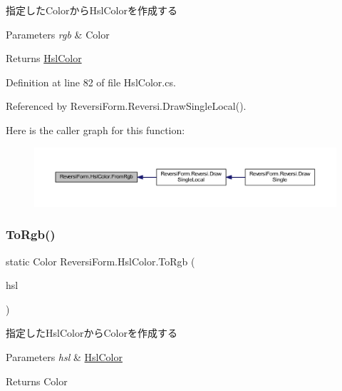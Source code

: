 指定した\+Colorから\+Hsl\+Colorを作成する 


\begin{DoxyParams}{Parameters}
{\em rgb} & Color\\
\hline
\end{DoxyParams}
\begin{DoxyReturn}{Returns}
\hyperlink{class_reversi_form_1_1_hsl_color}{Hsl\+Color}
\end{DoxyReturn}


Definition at line 82 of file Hsl\+Color.\+cs.



Referenced by Reversi\+Form.\+Reversi.\+Draw\+Single\+Local().

Here is the caller graph for this function\+:
\nopagebreak
\begin{figure}[H]
\begin{center}
\leavevmode
\includegraphics[width=350pt]{class_reversi_form_1_1_hsl_color_a1ef52b0701860ca2021e74e8ee369789_icgraph}
\end{center}
\end{figure}
\mbox{\label{class_reversi_form_1_1_hsl_color_aa7036039dd3abc7a1216be97656467df}} 
\subsubsection{\texorpdfstring{To\+Rgb()}{ToRgb()}}
{\footnotesize\ttfamily static Color Reversi\+Form.\+Hsl\+Color.\+To\+Rgb (\begin{DoxyParamCaption}\item[{\hyperlink{class_reversi_form_1_1_hsl_color}{Hsl\+Color}}]{hsl }\end{DoxyParamCaption})\hspace{0.3cm}{\ttfamily [static]}}



指定した\+Hsl\+Colorから\+Colorを作成する 


\begin{DoxyParams}{Parameters}
{\em hsl} & \hyperlink{class_reversi_form_1_1_hsl_color}{Hsl\+Color}\\
\hline
\end{DoxyParams}
\begin{DoxyReturn}{Returns}
Color
\end{DoxyReturn}


